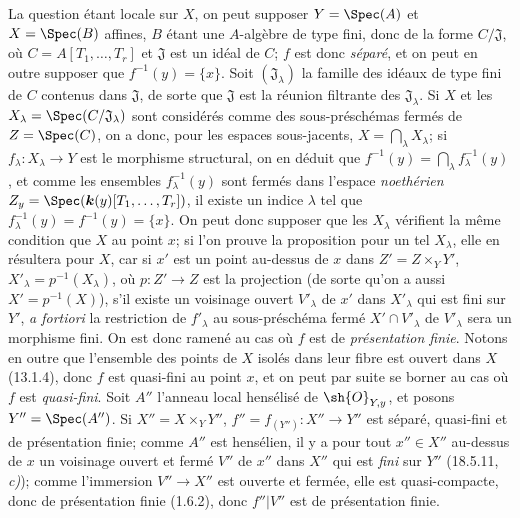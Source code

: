 La question étant locale sur $X$, on peut supposer $Y=\Spec(A)$ et $X=\Spec(B)$ affines, $B$ étant une $A$-algèbre de type fini, donc de la forme $C/\mathfrak J$, où $C=A[T_1,\ldots,T_r]$ et $\mathfrak J$ est un idéal de $C$; $f$ est donc \emph{séparé}, et on peut en outre supposer que $f^{-1}(y)=\{x\}$. Soit $(\mathfrak J_\lambda)$ la famille des idéaux de type fini de $C$ contenus dans $\mathfrak J$, de sorte que $\mathfrak J$ est la réunion filtrante des $\mathfrak J_\lambda$. Si $X$ et les $X_\lambda=\Spec(C/\mathfrak J_\lambda)$ sont considérés comme des sous-préschémas fermés de $Z=\Spec(C)$, on a donc, pour les espaces sous-jacents, $X=\bigcap_\lambda X_\lambda$; si $f_\lambda:X_\lambda\to Y$ est le morphisme structural, on en déduit que $f^{-1}(y)=\bigcap_\lambda f_\lambda^{-1}(y)$, et comme les ensembles $f_\lambda^{-1}(y)$ sont fermés dans l'espace \emph{noethérien} $Z_y=\Spec(\boldsymbol{k}(y)[T_1,\ldots,T_r])$, il existe un indice $\lambda$ tel que $f_\lambda^{-1}(y)=f^{-1}(y)=\{x\}$. On peut donc supposer que les $X_\lambda$ vérifient la même condition que $X$ au point $x$; si l'on prouve la proposition pour un tel $X_\lambda$, elle en résultera pour $X$, car si $x'$ est un point au-dessus de $x$ dans $Z'=Z\times_Y Y'$, $X'_\lambda=p^{-1}(X_\lambda)$, où $p:Z'\to Z$ est la projection (de sorte qu'on a aussi $X'=p^{-1}(X)$), s'il existe un voisinage ouvert $V'_\lambda$ de $x'$ dans $X'_\lambda$ qui est fini sur $Y'$, \emph{a fortiori} la restriction de $f'_\lambda$ au sous-préschéma fermé $X'\cap V'_\lambda$ de $V'_\lambda$ sera un morphisme fini. On est donc ramené au cas où $f$ est de \emph{présentation finie}.
Notons en outre que l'ensemble des points de $X$ isolés dans leur fibre est ouvert dans $X$ (13.1.4), donc $f$ est quasi-fini au point $x$, et on peut par suite se borner au cas où $f$ est \emph{quasi-fini}. Soit $A''$ l'anneau local hensélisé de $\sh{O}_{Y,y}$, et posons $Y''=\Spec(A'')$. Si $X''=X\times_Y Y''$, $f''=f_{(Y'')}:X''\to Y''$ est séparé, quasi-fini et de présentation finie; comme $A''$ est hensélien, il y a pour tout $x''\in X''$ au-dessus de $x$ un voisinage ouvert et fermé $V''$ de $x''$ dans $X''$ qui est \emph{fini} sur $Y''$ (18.5.11, \emph{c)}); comme l'immersion $V''\to X''$ est ouverte et fermée, elle est quasi-compacte, donc de présentation finie (1.6.2), donc $f''|V''$ est de présentation finie.


